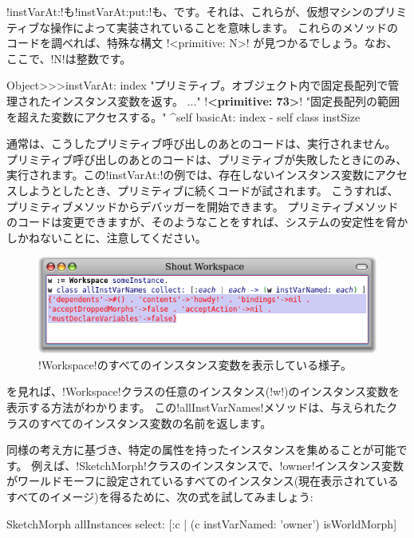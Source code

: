 \documentclass[a4paper,10pt,twoside]{book}
\begin{document}
\ct!instVarAt:!も\ct!instVarAt:put:!も、です。それは、これらが、\pharo 仮想マシンのプリミティブな操作によって実装されていることを意味します。 %
これらのメソッドのコードを調べれば、特殊な構文 \ct!<primitive: N>! が見つかるでしょう。なお、ここで、\ct!N!は整数です。

\begin{code}{}
Object>>>instVarAt: index 
	"プリミティブ。オブジェクト内で固定長配列で管理されたインスタンス変数を返す。 ..."
	!\textbf{<primitive: 73>}!
	"固定長配列の範囲を超えた変数にアクセスする。"
	^self basicAt: index - self class instSize		
\end{code}

通常は、こうしたプリミティブ呼び出しのあとのコードは、実行されません。
プリミティブ呼び出しのあとのコードは、プリミティブが失敗したときにのみ、実行されます。この\ct!instVarAt:!の例では、存在しないインスタンス変数にアクセスしようとしたとき、プリミティブに続くコードが試されます。
こうすれば、プリミティブメソッドからデバッガーを開始できます。
プリミティブメソッドのコードは変更できますが、そのようなことをすれば、\pharo システムの安定性を脅かしかねないことに、注意してください。 %

\begin{figure}[ht]\centering
	\includegraphics[width=\linewidth]{allInstanceVariables}
	\caption{\ct!Workspace!のすべてのインスタンス変数を表示している様子。}
\end{figure}

を見れば、\ct!Workspace!クラスの任意のインスタンス(\ct!w!)のインスタンス変数を表示する方法がわかります。
この\ct!allInstVarNames!メソッドは、与えられたクラスのすべてのインスタンス変数の名前を返します。

同様の考え方に基づき、特定の属性を持ったインスタンスを集めることが可能です。 %
例えば、\ct!SketchMorph!クラスのインスタンスで、\ct!owner!インスタンス変数がワールドモーフに設定されているすべてのインスタンス(\ie 現在表示されているすべてのイメージ)を得るために、次の式を試してみましょう:
\begin{code}{}
SketchMorph allInstances select: [:c | (c instVarNamed: 'owner') isWorldMorph]
\end{code}
\end{document}
